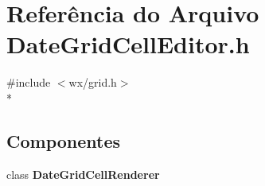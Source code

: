 \section{Referência do Arquivo Date\+Grid\+Cell\+Editor.\+h}
\label{_date_grid_cell_editor_8h}
{\ttfamily \#include $<$wx/grid.\+h$>$}\\*
\subsection*{Componentes}
\begin{DoxyCompactItemize}
\item 
class {\bf Date\+Grid\+Cell\+Renderer}
\end{DoxyCompactItemize}
